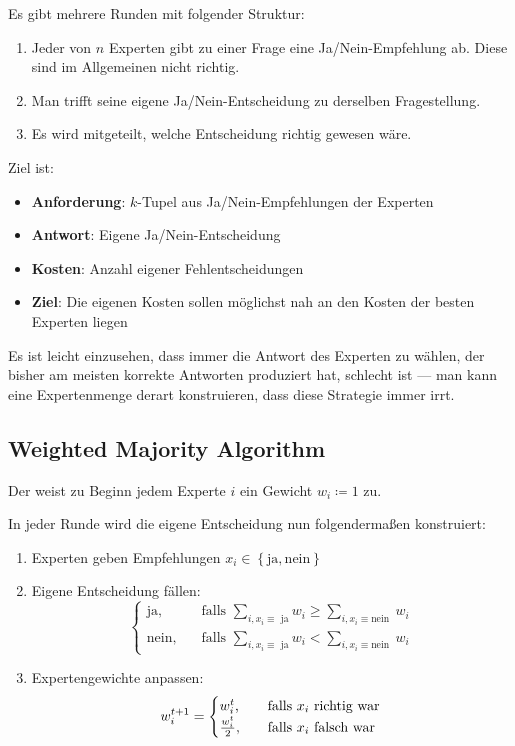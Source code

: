 Es gibt mehrere Runden mit folgender Struktur:
\begin{enumerate}
  \item Jeder von \( n \) Experten gibt zu einer Frage eine Ja/Nein-Empfehlung ab. Diese sind im Allgemeinen nicht richtig.
  \item Man trifft seine eigene Ja/Nein-Entscheidung zu derselben Fragestellung.
  \item Es wird mitgeteilt, welche Entscheidung richtig gewesen wäre.
\end{enumerate}

Ziel ist:
\begin{itemize}
  \item \textbf{Anforderung}: \( k \)-Tupel aus Ja/Nein-Empfehlungen der Experten
  \item \textbf{Antwort}: Eigene Ja/Nein-Entscheidung
  \item \textbf{Kosten}: Anzahl eigener Fehlentscheidungen
  \item \textbf{Ziel}: Die eigenen Kosten sollen möglichst nah an den Kosten der besten Experten liegen
\end{itemize}

Es ist leicht einzusehen, dass immer die Antwort des Experten zu wählen, der bisher am meisten korrekte Antworten produziert hat, schlecht ist --- man kann eine Expertenmenge derart konstruieren, dass diese Strategie immer irrt.

\subsection{Weighted Majority Algorithm}

Der  weist zu Beginn jedem Experte \( i \) ein Gewicht \( w_i \coloneqq 1 \) zu.

In jeder Runde wird die eigene Entscheidung nun folgendermaßen konstruiert:
\begin{enumerate}
  \item Experten geben Empfehlungen \( x_i \in \left \{ \text{ja}, \text{nein} \right \} \)
  \item Eigene Entscheidung fällen:
  \begin{equation*}
    \begin{cases}
      \text{ja,} \quad &\text{falls } \sum_{i,x_i\equiv \text{ ja}}w_i \geq \sum_{i,x_i \equiv \text{nein }}w_i \\
      \text{nein,} \quad &\text{falls } \sum_{i,x_i\equiv \text{ ja}}w_i < \sum_{i,x_i \equiv \text{nein }}w_i
    \end{cases}
  \end{equation*}
  \item Expertengewichte anpassen:
  \begin{equation*}
    w_i^{t+1} = \begin{cases}
      w_i^t\text{,} \quad &\text{falls \( x_i \) richtig war} \\
      \frac{w_i^t}{2}\text{,} \quad &\text{falls \( x_i \) falsch war}
    \end{cases}
  \end{equation*}
\end{enumerate}

